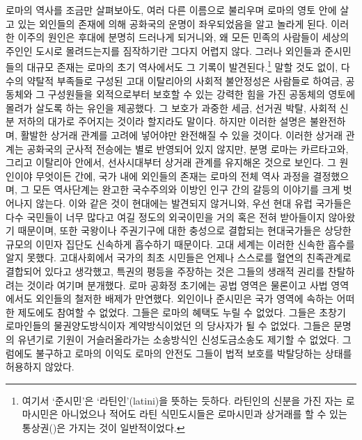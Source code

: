 로마의 역사를 조금만 살펴보아도,
여러 다른 이름으로 불리우며
로마의 영토 안에
살고 있는 외인들의 존재에 의해 공화국의 운명이
좌우되었음을 알고 놀라게 된다.
이러한 이주의 원인은 후대에 분명히 드러나게 되거니와,
왜 모든 민족의 사람들이 세상의 주인인 도시로 몰려드는지를
짐작하기란 그다지 어렵지 않다.
그러나 외인들과 준시민들의 대규모 존재는
로마의 초기 역사에서도 그 기록이 발견된다.\footnote{%
  여기서 `준시민'은 `라틴인'(latini)을 뜻하는 듯하다.
  라틴인의 신분을 가진 자는 로마시민은 아니었으나 적어도
  라틴 식민도시들은
  로마시민과 상거래를 할 수 있는 통상권()은
  가지는 것이 일반적이었다. }
말할 것도 없이,
다수의 약탈적 부족들로 구성된 고대 이탈리아의 사회적 불안정성은
사람들로 하여금, 공동체와 그 구성원들을 외적으로부터 보호할 수 있는
강력한 힘을 가진 공동체의 영토에 몰려가 살도록 하는 유인을 제공했다.
그 보호가 과중한 세금, 선거권 박탈, 사회적 신분 저하의 대가로
주어지는 것이라 할지라도 말이다.
하지만 이러한 설명은 불완전하며,
활발한 상거래 관계를 고려에 넣어야만 완전해질 수 있을 것이다.
이러한 상거래 관계는 공화국의 군사적 전승에는
별로 반영되어 있지 않지만,
분명 로마는 카르타고와, 그리고 이탈리아 안에서,
선사시대부터 상거래 관계를 유지해온 것으로 보인다.
그 원인이야 무엇이든 간에,
국가 내에 외인들의 존재는
로마의 전체 역사 과정을 결정했으며,
그 모든 역사단계는 완고한 국수주의와 이방인 인구 간의 갈등의 이야기를
크게 벗어나지 않는다.
이와 같은 것이 현대에는 발견되지 않거니와,
우선 현대 유럽 국가들은 다수 국민들이 너무 많다고 여길 정도의
외국이민을 거의 혹은 전혀 받아들이지 않아왔기 때문이며,
또한
국왕이나 주권기구에 대한 충성으로 결합되는 현대국가들은
상당한 규모의 이민자 집단도
신속하게 흡수하기 때문이다.
고대 세계는 이러한 신속한 흡수를 알지 못했다.
고대사회에서 국가의 최초 시민들은 언제나 스스로를 혈연의 친족관계로
결합되어 있다고 생각했고,
특권의 평등을 주장하는 것은 그들의 생래적 권리를 찬탈하려는 것이라
여기며 분개했다.
로마 공화정 초기에는
공법 영역은 물론이고 사법 영역에서도
외인들의 철저한 배제가 만연했다.
외인이나 준시민은
국가 영역에 속하는 어떠한 제도에도 참여할 수 없었다.
그들은 로마의 혜택도 누릴 수 없었다.
그들은 초창기 로마인들의 물권양도방식이자 계약방식이었던
의 당사자가 될 수 없었다.
그들은 문명의 유년기로 기원이 거슬러올라가는 소송방식인
신성도금소송도 제기할 수 없었다.
그럼에도 불구하고 로마의 이익도 로마의 안전도 그들이 법적 보호를 박탈당하는
상태를 허용하지 않았다.
